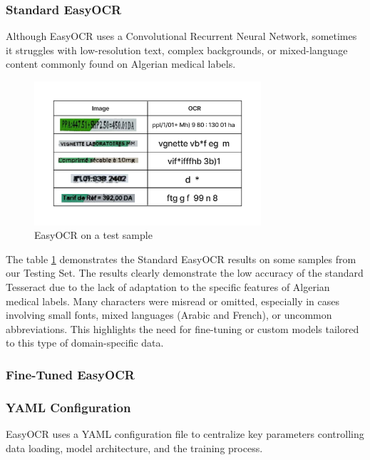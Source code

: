 \subsubsection{Standard EasyOCR}

Although EasyOCR uses a Convolutional Recurrent Neural Network, sometimes it struggles with low-resolution text, complex backgrounds, or mixed-language content commonly found on Algerian medical labels.

\begin{figure}[H]
\centering
\includegraphics[width=0.75\textwidth]{Figures/Chapter 3/standard_easyocr_results.png}
\caption{EasyOCR on a test sample}
\label{fig:standardeasyocrresults}
\end{figure}

The table \ref{fig:standardeasyocrresults} demonstrates the Standard EasyOCR results on some samples from our Testing Set. The results clearly demonstrate the low accuracy of the standard Tesseract due to the lack of adaptation to the specific features of Algerian medical labels. Many characters were misread or omitted, especially in cases involving small fonts, mixed languages (Arabic and French), or uncommon abbreviations. This highlights the need for fine-tuning or custom models tailored to this type of domain-specific data.


\subsubsection{Fine-Tuned EasyOCR}
\subsubsection*{YAML Configuration}

EasyOCR uses a YAML configuration file to centralize key parameters controlling data loading, model architecture, and the training process.

